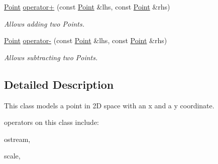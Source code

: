 \begin{DoxyCompactItemize}
\mbox{\hyperlink{class_jinks_draw_1_1_point}{Point}} \mbox{\hyperlink{class_jinks_draw_1_1_point_a607e608ebadca0198af3a6d8a001ec4a}{operator+}} (const \mbox{\hyperlink{class_jinks_draw_1_1_point}{Point}} \&lhs, const \mbox{\hyperlink{class_jinks_draw_1_1_point}{Point}} \&rhs)
\begin{DoxyCompactList}\small\item\em Allows adding two Points. \end{DoxyCompactList}\item 
\mbox{\hyperlink{class_jinks_draw_1_1_point}{Point}} \mbox{\hyperlink{class_jinks_draw_1_1_point_a35071bf200fdd94b49abf93d595b3b24}{operator-\/}} (const \mbox{\hyperlink{class_jinks_draw_1_1_point}{Point}} \&lhs, const \mbox{\hyperlink{class_jinks_draw_1_1_point}{Point}} \&rhs)
\begin{DoxyCompactList}\small\item\em Allows subtracting two Points. \end{DoxyCompactList}\end{DoxyCompactItemize}


\subsection{Detailed Description}
This class models a point in 2D space with an x and a y coordinate. 

operators on this class include\+:

ostream, 
\begin{DoxyCode}{0}
\end{DoxyCode}


scale, 
\begin{DoxyCode}{0}
\DoxyCodeLine{}
\DoxyCodeLine{}
\end{DoxyCode}


